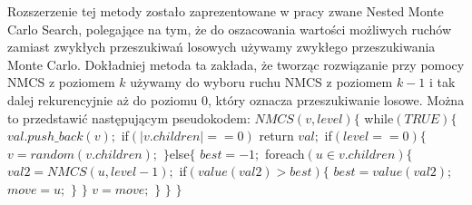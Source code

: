 \documentclass{pracamgr}
\begin{document}
     Rozszerzenie tej metody zostało zaprezentowane w pracy \cite{NMCS} zwane Nested Monte Carlo Search, polegające na tym, że do oszacowania
     wartości możliwych ruchów zamiast zwykłych przeszukiwań losowych używamy zwykłego przeszukiwania Monte Carlo.
     Dokładniej metoda ta zakłada, że tworząc rozwiązanie przy pomocy NMCS z poziomem $k$ używamy do wyboru ruchu NMCS z poziomem $k-1$ i tak dalej rekurencyjnie
     aż do poziomu $0$, który oznacza przeszukiwanie losowe. Można to przedstawić następującym pseudokodem:\newline
     \hspace*{0pt}$NMCS(v,level)\{$\newline
     \hspace*{16pt}	while$(TRUE)\{$\newline
     \hspace*{32pt}		$val.push\_back(v);$\newline
     \hspace*{32pt}		if$(|v.children|==0)$ return $val;$\newline
     \hspace*{32pt}		if$(level==0)\{$\newline
     \hspace*{48pt}			$v=random(v.children);$\newline
     \hspace*{32pt}		$\}$else$\{$\newline
     \hspace*{48pt}			$best=-1;$\newline    
     \hspace*{48pt}			foreach$(u\in v.children)\{$\newline
     \hspace*{64pt}				$val2=NMCS(u,level-1);$\newline
     \hspace*{64pt}				if$(value(val2)>best)\{$\newline
     \hspace*{80pt}					$best=value(val2);$\newline
     \hspace*{80pt}					$move=u;$\newline
     \hspace*{64pt}				$\}$\newline
     \hspace*{48pt}			$\}$\newline
     \hspace*{48pt}			$v=move;$\newline
     \hspace*{32pt}		$\}$\newline
     \hspace*{16pt}	$\}$\newline
     \hspace*{0pt}$\}$
\end{document}
